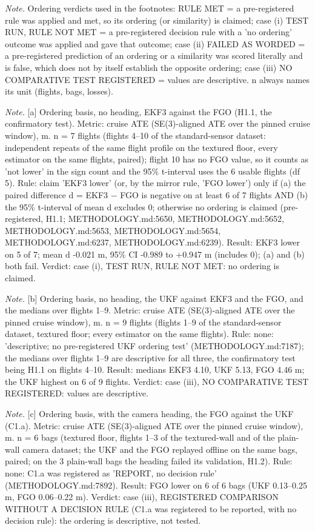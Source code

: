 \begin{table}[htbp]
\textit{Note.} Ordering verdicts used in the footnotes: RULE MET = a pre-registered rule was applied and met, so its ordering (or similarity) is claimed; case (i) TEST RUN, RULE NOT MET = a pre-registered decision rule with a 'no ordering' outcome was applied and gave that outcome; case (ii) FAILED AS WORDED = a pre-registered prediction of an ordering or a similarity was scored literally and is false, which does not by itself establish the opposite ordering; case (iii) NO COMPARATIVE TEST REGISTERED = values are descriptive. n always names its unit (flights, bags, losses).\par
\textit{Note.} [a] Ordering basis, no heading, EKF3 against the FGO (H1.1, the confirmatory test). Metric: cruise ATE (SE(3)-aligned ATE over the pinned cruise window), m. n = 7 flights (flights 4--10 of the standard-sensor dataset: independent repeats of the same flight profile on the textured floor, every estimator on the same flights, paired); flight 10 has no FGO value, so it counts as 'not lower' in the sign count and the 95\% t-interval uses the 6 usable flights (df 5). Rule: claim 'EKF3 lower' (or, by the mirror rule, 'FGO lower') only if (a) the paired difference d = EKF3 $-$ FGO is negative on at least 6 of 7 flights AND (b) the 95\% t-interval of mean d excludes 0; otherwise no ordering is claimed (pre-registered, H1.1; METHODOLOGY.md:5650, METHODOLOGY.md:5652, METHODOLOGY.md:5653, METHODOLOGY.md:5654, METHODOLOGY.md:6237, METHODOLOGY.md:6239). Result: EKF3 lower on 5 of 7; mean d -0.021 m, 95\% CI -0.989 to +0.947 m (includes 0); (a) and (b) both fail. Verdict: case (i), TEST RUN, RULE NOT MET: no ordering is claimed.\par
\textit{Note.} [b] Ordering basis, no heading, the UKF against EKF3 and the FGO, and the medians over flights 1--9. Metric: cruise ATE (SE(3)-aligned ATE over the pinned cruise window), m. n = 9 flights (flights 1--9 of the standard-sensor dataset, textured floor; every estimator on the same flights). Rule: none: 'descriptive; no pre-registered UKF ordering test' (METHODOLOGY.md:7187); the medians over flights 1--9 are descriptive for all three, the confirmatory test being H1.1 on flights 4--10. Result: medians EKF3 4.10, UKF 5.13, FGO 4.46 m; the UKF highest on 6 of 9 flights. Verdict: case (iii), NO COMPARATIVE TEST REGISTERED: values are descriptive.\par
\textit{Note.} [c] Ordering basis, with the camera heading, the FGO against the UKF (C1.a). Metric: cruise ATE (SE(3)-aligned ATE over the pinned cruise window), m. n = 6 bags (textured floor, flights 1--3 of the textured-wall and of the plain-wall camera dataset; the UKF and the FGO replayed offline on the same bags, paired; on the 3 plain-wall bags the heading failed its validation, H1.2). Rule: none: C1.a was registered as 'REPORT, no decision rule' (METHODOLOGY.md:7892). Result: FGO lower on 6 of 6 bags (UKF 0.13--0.25 m, FGO 0.06--0.22 m). Verdict: case (iii), REGISTERED COMPARISON WITHOUT A DECISION RULE (C1.a was registered to be reported, with no decision rule): the ordering is descriptive, not tested.\par

\end{table}
